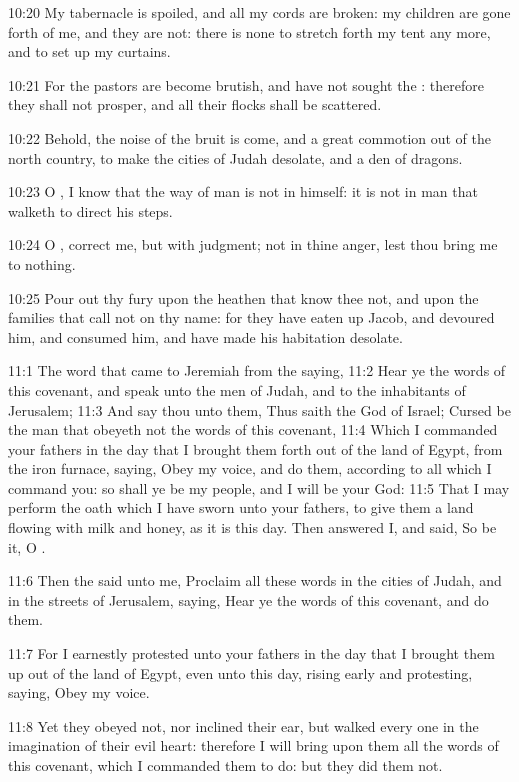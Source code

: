 10:20 My tabernacle is spoiled, and all my cords are broken: my children are gone forth of me, and they are not: there is none to stretch forth my tent any more, and to set up my curtains.

10:21 For the pastors are become brutish, and have not sought the \LORD: therefore they shall not prosper, and all their flocks shall be scattered.

10:22 Behold, the noise of the bruit is come, and a great commotion out of the north country, to make the cities of Judah desolate, and a den of dragons.

10:23 O \LORD, I know that the way of man is not in himself: it is not in man that walketh to direct his steps.

10:24 O \LORD, correct me, but with judgment; not in thine anger, lest thou bring me to nothing.

10:25 Pour out thy fury upon the heathen that know thee not, and upon the families that call not on thy name: for they have eaten up Jacob, and devoured him, and consumed him, and have made his habitation desolate.

11:1 The word that came to Jeremiah from the \LORD saying, 11:2 Hear ye the words of this covenant, and speak unto the men of Judah, and to the inhabitants of Jerusalem; 11:3 And say thou unto them, Thus saith the \LORD God of Israel; Cursed be the man that obeyeth not the words of this covenant, 11:4 Which I commanded your fathers in the day that I brought them forth out of the land of Egypt, from the iron furnace, saying, Obey my voice, and do them, according to all which I command you: so shall ye be my people, and I will be your God: 11:5 That I may perform the oath which I have sworn unto your fathers, to give them a land flowing with milk and honey, as it is this day. Then answered I, and said, So be it, O \LORD.

11:6 Then the \LORD said unto me, Proclaim all these words in the cities of Judah, and in the streets of Jerusalem, saying, Hear ye the words of this covenant, and do them.

11:7 For I earnestly protested unto your fathers in the day that I brought them up out of the land of Egypt, even unto this day, rising early and protesting, saying, Obey my voice.

11:8 Yet they obeyed not, nor inclined their ear, but walked every one in the imagination of their evil heart: therefore I will bring upon them all the words of this covenant, which I commanded them to do: but they did them not.

